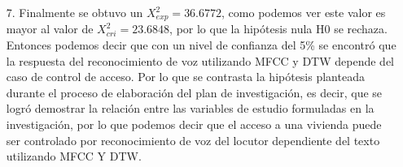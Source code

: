 \begin{enumerate}
\item[7.] Finalmente se obtuvo un $X^{2}_{exp} = 36.6772$, como podemos ver este valor es mayor al valor de $X^{2}_{cri} = 23.6848$, por lo que la hipótesis nula H0 se rechaza. Entonces podemos decir que con un nivel de confianza del 5\% se encontró que la respuesta del reconocimiento de voz utilizando MFCC y DTW depende del caso de control de acceso. Por lo que se contrasta la hipótesis planteada durante el proceso de elaboración del plan de investigación, es decir, que se logró demostrar la relación entre las variables de estudio formuladas en la investigación, por lo que podemos decir que el acceso a una vivienda puede ser controlado por reconocimiento de voz del locutor dependiente del texto utilizando MFCC Y DTW.

\end{enumerate}







